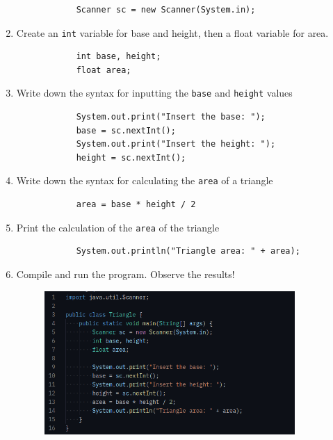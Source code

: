 \documentclass[12pt,titlepage]{article}
\begin{document}
\begin{enumerate}
{\begin{verbatim}
            Scanner sc = new Scanner(System.in);
        \end{verbatim}
    }
    \pagebreak
    \item {
        Create an \texttt{int} variable for base and height, then a float variable for area.
        \begin{verbatim}
            int base, height;
            float area;
        \end{verbatim}
    }
    \item {
        Write down the syntax for inputting the \texttt{base} and \texttt{height} values
        \begin{verbatim}
            System.out.print("Insert the base: ");
            base = sc.nextInt();
            System.out.print("Insert the height: ");
            height = sc.nextInt();
        \end{verbatim}
    }
    \item {
        Write down the syntax for calculating the \texttt{area} of a triangle
        \begin{verbatim}
            area = base * height / 2
        \end{verbatim}
    }
    \item {
        Print the calculation of the \texttt{area} of the triangle
        \begin{verbatim}
            System.out.println("Triangle area: " + area);
        \end{verbatim}
    }
    \item Compile and run the program. Observe the results!
    \begin{figure}[h]
        \centering
        \includegraphics[width=0.9\textwidth]{./images/triangle-code.png}

\end{figure}
\end{enumerate}
\end{document}
